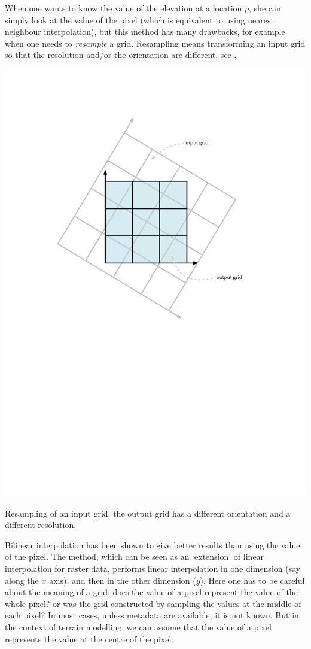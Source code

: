When one wants to know the value of the elevation at a location $p$, she can simply look at the value of the pixel (which is equivalent to using nearest neighbour interpolation), but this method has many drawbacks, for example when one needs to \emph{resample} a grid. 
Resampling means transforming an input grid so that the resolution and/or the orientation are different, see .
\begin{marginfigure}
  \centering
  \includegraphics[width=\textwidth]{figs/resampling}
  \caption{Resampling of an input grid, the output grid has a different orientation and a different resolution.} %
\end{marginfigure}

Bilinear interpolation has been shown to give better results than using the value of the pixel. 
The method, which can be seen as an `extension' of linear interpolation for raster data, performs linear interpolation in one dimension (say along the $x$ axis), and then in the other dimension ($y$). 
Here one has to be careful about the meaning of a grid: does the value of a pixel represent the value of the whole pixel? or was the grid constructed by sampling the values at the middle of each pixel? 
In most cases, unless metadata are available, it is not known. 
But in the context of terrain modelling, we can assume that the value of a pixel represents the value at the centre of the pixel.

